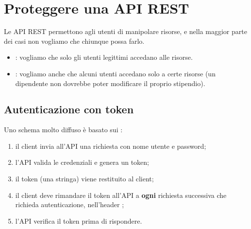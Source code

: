 \section{Proteggere una API REST}

Le API REST permettono agli utenti di manipolare risorse, e nella maggior parte
dei casi non vogliamo che chiunque possa farlo.

\begin{itemize}
  \item {}: vogliamo che solo gli utenti legittimi accedano
        alle risorse.
  \item {}: vogliamo anche che alcuni utenti accedano solo a
        certe risorse (un dipendente non dovrebbe poter modificare il proprio
        stipendio).
\end{itemize}

\subsection{Autenticazione con token}

Uno schema molto diffuso è basato sui :

\begin{enumerate}
  \item il client invia all'API una richiesta con nome utente e password;
  \item l'API valida le credenziali e genera un token;
  \item il token (una stringa) viene restituito al client;
  \item il client deve rimandare il token all'API a \textbf{ogni} richiesta
        successiva che richieda autenticazione, nell'header
        ;
  \item l'API verifica il token prima di rispondere.
\end{enumerate}


